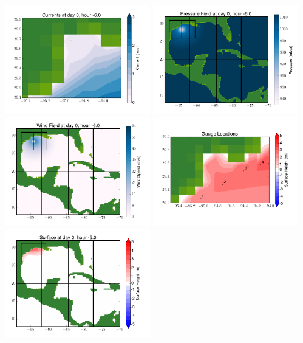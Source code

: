\documentclass[11pt]{article}
\begin{document}
\vskip 10pt 
\includegraphics[width=0.475\textwidth]{frame0066fig7.png}
\includegraphics[width=0.475\textwidth]{frame0066fig8.png}
\vskip 10pt 
\includegraphics[width=0.475\textwidth]{frame0066fig9.png}
\includegraphics[width=0.475\textwidth]{frame0066fig10.png}
\vskip 10pt 
\includegraphics[width=0.475\textwidth]{frame0067fig1.png}
\end{document}
